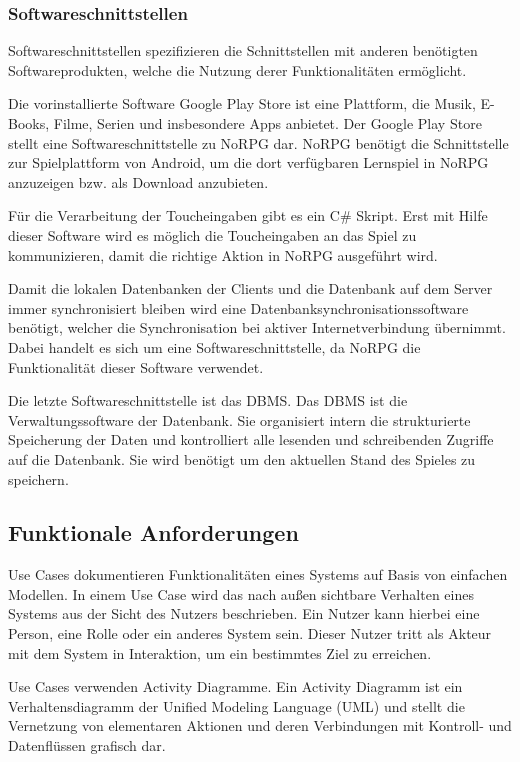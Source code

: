 		\subsubsection{Softwareschnittstellen}
			Softwareschnittstellen spezifizieren die Schnittstellen mit anderen benötigten Softwareprodukten, welche die Nutzung derer Funktionalitäten ermöglicht.
			
			Die vorinstallierte Software Google Play Store ist eine Plattform, die Musik, E-Books, Filme, Serien und insbesondere Apps anbietet. Der Google Play Store stellt eine Softwareschnittstelle zu NoRPG dar. NoRPG benötigt die Schnittstelle zur Spielplattform von Android, um die dort verfügbaren Lernspiel in NoRPG anzuzeigen bzw. als Download anzubieten.
			
			Für die Verarbeitung der Toucheingaben gibt es ein C\# Skript. Erst mit Hilfe dieser Software wird es möglich die Toucheingaben an das Spiel zu kommunizieren, damit die richtige Aktion in NoRPG ausgeführt wird.
			
			Damit die lokalen Datenbanken der Clients und die Datenbank auf dem Server immer synchronisiert bleiben wird eine Datenbanksynchronisationssoftware benötigt, welcher die Synchronisation bei aktiver Internetverbindung übernimmt. Dabei handelt es sich um eine Softwareschnittstelle, da NoRPG die Funktionalität dieser Software verwendet.
			
			Die letzte Softwareschnittstelle ist das \ac{DBMS}. Das \ac{DBMS} ist die Verwaltungssoftware der Datenbank. Sie organisiert intern die strukturierte Speicherung der Daten und kontrolliert alle lesenden und schreibenden Zugriffe auf die Datenbank. Sie wird benötigt um den aktuellen Stand des Spieles zu speichern.

	\subsection{Funktionale Anforderungen}
		Use Cases dokumentieren Funktionalitäten eines Systems auf Basis von einfachen Modellen. In einem Use Case wird das nach außen sichtbare Verhalten eines Systems aus der Sicht des Nutzers beschrieben. Ein Nutzer kann hierbei eine Person, eine Rolle oder ein anderes System sein. Dieser Nutzer tritt als Akteur mit dem System in Interaktion, um ein bestimmtes Ziel zu erreichen.
		
		Use Cases verwenden Activity Diagramme. Ein Activity Diagramm ist ein Verhaltensdiagramm der Unified Modeling Language (UML) und stellt die Vernetzung von elementaren Aktionen und deren Verbindungen mit Kontroll- und Datenflüssen grafisch dar.
	
